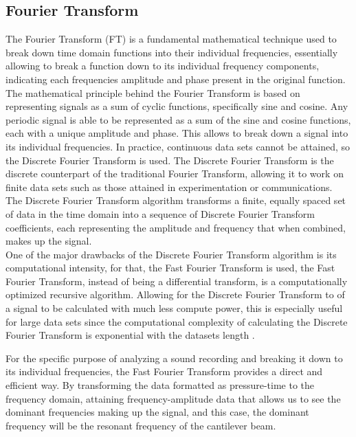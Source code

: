 \documentclass[a4paper,12pt]{article}
\begin{document}
    \subsection{Fourier Transform} \label{FT}%
    The Fourier Transform (FT) is a fundamental mathematical technique used to break down time domain functions into their individual frequencies, essentially allowing to break a function down to its individual frequency components, indicating each frequencies amplitude and phase present in the original function.\\
    The mathematical principle behind the Fourier Transform is based on representing signals as a sum of cyclic functions, specifically sine and cosine.
    Any periodic signal is able to be represented as a sum of the sine and cosine functions, each with a unique amplitude and phase. This allows to break down a signal into its individual frequencies.
    In practice, continuous data sets cannot be attained, so the Discrete Fourier Transform is used. The Discrete Fourier Transform is the discrete counterpart of the traditional Fourier Transform, allowing it to work on finite data sets such as those attained in experimentation or communications.
    The Discrete Fourier Transform algorithm transforms a finite, equally spaced set of data in the time domain into a sequence of Discrete Fourier Transform coefficients, each representing the amplitude and frequency that when combined, makes up the signal.\\
    One of the major drawbacks of the Discrete Fourier Transform algorithm is its computational intensity, for that, the Fast Fourier Transform is used, the Fast Fourier Transform, instead of being a differential transform, is a computationally optimized recursive algorithm. Allowing for the Discrete Fourier Transform to of a signal to be calculated with much less compute power, this is especially useful for large data sets since the computational complexity of calculating the Discrete Fourier Transform is exponential with the datasets length \autocite{FFTBook}.

    For the specific purpose of analyzing a sound recording and breaking it down to its individual frequencies, the Fast Fourier Transform provides a direct and efficient way. By transforming the data formatted as pressure-time to the frequency domain, attaining frequency-amplitude data that allows us to see the dominant frequencies making up the signal, and this case, the dominant frequency will be the resonant frequency of the cantilever beam.
\end{document}
